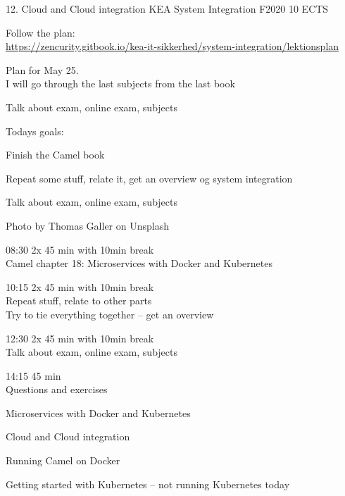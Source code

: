 \documentclass[Screen16to9,17pt]{foils}
\begin{document}
\mytitlepage
{12. Cloud and Cloud integration}
{KEA System Integration F2020 10 ECTS}




\begin{list2}
\item Follow the plan:\\
\url{https://zencurity.gitbook.io/kea-it-sikkerhed/system-integration/lektionsplan}
\item Plan for May 25.\\
I will go through the last subjects from the last book
\item Talk about exam, online exam, subjects
\end{list2}



Todays goals:
\begin{list2}
\item Finish the Camel book
\item Repeat some stuff, relate it, get an overview og system integration
\item Talk about exam, online exam, subjects
\end{list2}

Photo by Thomas Galler on Unsplash


\begin{list2}
\item 08:30 2x 45 min with 10min break\\
Camel chapter 18: Microservices with Docker and Kubernetes
\item 10:15 2x 45 min with 10min break\\
Repeat stuff, relate to other parts\\
Try to tie everything together -- get an overview
\item 12:30 2x 45 min with 10min break \\
Talk about exam, online exam, subjects
\item 14:15 45 min\\
Questions and exercises
\end{list2}






\begin{list2}
\item Microservices with Docker and Kubernetes
\item Cloud and Cloud integration
\item Running Camel on Docker
\item Getting started with Kubernetes -- not running Kubernetes today
\end{list2}
\end{document}
